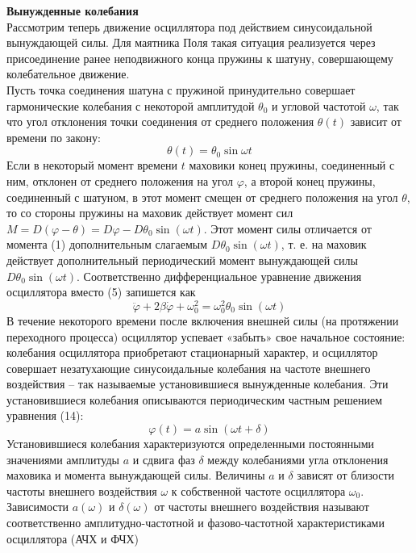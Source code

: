 \documentclass[a4paper]{article}
\begin{document}
\textbf{Вынужденные колебания}\\
Рассмотрим теперь движение осциллятора под действием синусоидальной вынуждающей силы. Для маятника Поля такая ситуация реализуется через присоединение ранее неподвижного конца пружины к шатуну, совершающему колебательное движение.\\
Пусть точка соединения шатуна с пружиной принудительно совершает гармонические колебания с некоторой амплитудой $\theta_0$ и угловой частотой $\omega$, так что угол отклонения точки соединения
от среднего положения $\theta(t)$ зависит от времени по закону:
\begin{equation}
\theta(t)=\theta_0\sin{\omega t}
\end{equation}
Если в некоторый момент времени $t$ маховики конец пружины, соединенный с ним, отклонен от среднего положения на угол $\varphi$, а второй конец пружины, соединенный с шатуном, в
этот момент смещен от среднего положения на угол $\theta$, то со
стороны пружины на маховик действует момент сил $M=D(\varphi-\theta)=D\varphi-D\theta_0\sin{(\omega t)}$. Этот момент силы отличается от момента (1) дополнительным слагаемым $D\theta_0\sin{(\omega t)}$, т. е. на маховик
действует дополнительный периодический момент вынуждающей
силы $D\theta_0\sin{(\omega t)}$. Соответственно дифференциальное уравнение
движения осциллятора вместо (5) запишется как
\begin{equation}
	\ddot{\varphi}+2\beta\dot{\varphi}+\omega_0^2=\omega_0^2\theta_0\sin{(\omega t)}
\end{equation}
В течение некоторого времени после включения внешней силы
(на протяжении переходного процесса) осциллятор успевает «забыть» свое начальное состояние: колебания осциллятора приобретают стационарный характер, и осциллятор совершает незатухающие синусоидальные колебания на частоте внешнего воздействия – так называемые установившиеся вынужденные колебания. Эти установившиеся колебания описываются периодическим
частным решением уравнения (14):
\begin{equation}
	\varphi(t)=a\sin{(\omega t+\delta)}
\end{equation}
Установившиеся колебания характеризуются определенными постоянными значениями амплитуды $a$ и сдвига фаз $\delta$ между колебаниями угла отклонения маховика и момента вынуждающей
силы. Величины $a$ и $\delta$ зависят от близости частоты внешнего
воздействия $\omega$ к собственной частоте осциллятора $\omega_0$. Зависимости $a(\omega)$ и $\delta(\omega)$ от частоты внешнего воздействия называют соответственно амплитудно-частотной и фазово-частотной характеристиками осциллятора (АЧХ и ФЧХ)
\end{document}
